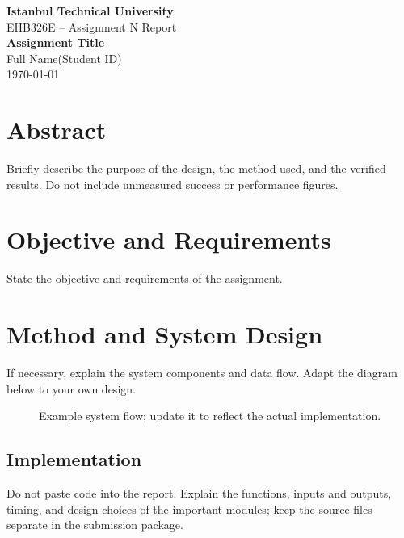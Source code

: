 \documentclass[12pt,a4paper]{article}
\newcommand{\ogrenciad}{Full Name}
\newcommand{\ogrencino}{Student ID}
\newcommand{\raporbasligi}{Assignment Title}
\begin{document}
\begin{center}
{\Large\bfseries Istanbul Technical University}\\[5pt]
{\large EHB326E -- Assignment N Report}\\[18pt]
{\LARGE\bfseries\color{baslik}\raporbasligi}\\[15pt]
\ogrenciad\quad(\ogrencino)\\[5pt]
\today
\end{center}
\vspace{1em}

\section{Abstract}
Briefly describe the purpose of the design, the method used, and the verified results. Do not include unmeasured success or performance figures.

\section{Objective and Requirements}
State the objective and requirements of the assignment.

\section{Method and System Design}
If necessary, explain the system components and data flow. Adapt the diagram below to your own design.

\begin{figure}[htbp]\centering
{}
\caption{Example system flow; update it to reflect the actual implementation.}
\label{fig:akis}
\end{figure}

\subsection{Implementation}
Do not paste code into the report. Explain the functions, inputs and outputs, timing, and design choices of the important modules; keep the source files separate in the submission package.
\end{document}
